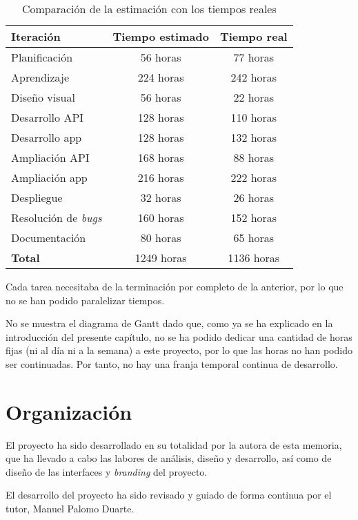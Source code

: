 \begin{table}[hbtp]
  \centering
  \begin{tabular}{|l|c|c|}
    \hline
    \textbf{Iteración} & \textbf{Tiempo estimado} & \textbf{Tiempo real} \\
    \hline
    Planificación & 56 horas & 77 horas \\
    \hline
    Aprendizaje & 224 horas & 242 horas \\
    \hline
    Diseño visual & 56 horas & 22 horas \\
    \hline
    Desarrollo API & 128 horas & 110 horas \\
    \hline
    Desarrollo app & 128 horas & 132 horas \\
    \hline
    Ampliación API & 168 horas & 88 horas \\
    \hline
    Ampliación app & 216 horas & 222 horas \\
    \hline
    Despliegue & 32 horas & 26 horas \\
    \hline
    Resolución de \textit{bugs} & 160 horas & 152 horas \\
    \hline
    Documentación & 80 horas & 65 horas \\
    \hline
    \textbf{Total} & 1249 horas & 1136 horas \\
    \hline
  \end{tabular}
  \caption{Comparación de la estimación con los tiempos reales}
  \label{tab:estimacion_tiempo}
\end{table}

Cada tarea necesitaba de la terminación por completo de la anterior, por lo que
no se han podido paralelizar tiempos.

No se muestra el diagrama de Gantt dado que, como ya se ha explicado en la
introducción del presente capítulo, no se ha podido dedicar una cantidad de horas
fijas (ni al día ni a la semana) a este proyecto, por lo que las horas no han
podido ser continuadas. Por tanto, no hay una franja temporal continua de
desarrollo.

\section{Organización}

El proyecto ha sido desarrollado en su totalidad por la autora de esta memoria,
que ha llevado a cabo las labores de análisis, diseño y desarrollo, así como de
diseño de las interfaces y \textit{branding} del proyecto.

El desarrollo del proyecto ha sido revisado y guiado de forma continua por el
tutor, Manuel Palomo Duarte.

